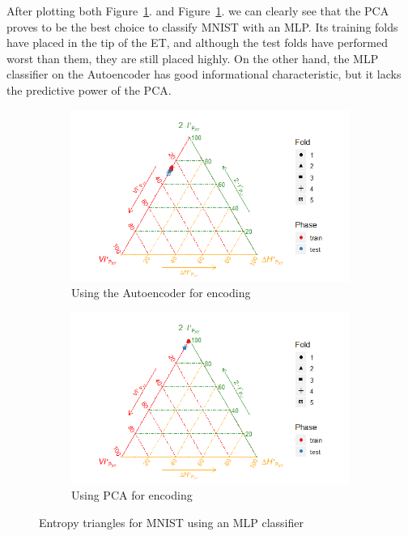 After plotting both Figure~\ref{fig:figure_Mlp_MNIST_ET_Auto}. and Figure~\ref{fig:figure_Mlp_MNIST_ET_Auto}. we can clearly see that the PCA  proves to be the best choice to classify MNIST with an MLP. Its training folds have placed in the tip of the ET, and although the test folds have performed worst than them, they are still placed highly. On the other hand, the MLP classifier on the Autoencoder has good informational characteristic, but it lacks the predictive power of the PCA.
%
\begin{figure}[H]
\begin{subfigure}{\textwidth}
	\centering
	\includegraphics[width=1\linewidth]{Figuras_tfg/MNIST_Autoencoder_mlp}
	\caption{Using the Autoencoder for encoding}
	\label{fig:figure_Mlp_MNIST_ET_Auto}
\end{subfigure}

\begin{subfigure}{\textwidth}
	\centering
	\includegraphics[width=1\linewidth]{Figuras_tfg/MNIST_PCA_mlp}
	\caption{Using PCA for encoding}
	\label{fig:figure_Mlp_MNIST_ET_PCA}
\end{subfigure}
\caption{Entropy triangles for MNIST using an MLP classifier}
\label{fig:figure_Mlp_MNIST_ET}
\end{figure}


